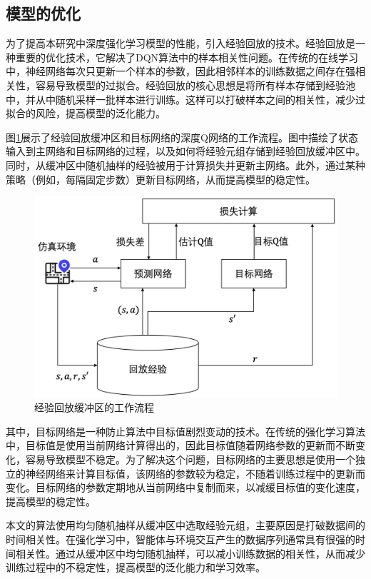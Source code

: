 \subsection{模型的优化}

为了提高本研究中深度强化学习模型的性能，引入经验回放的技术。经验回放是一种重要的优化技术，它解决了DQN算法中的样本相关性问题。在传统的在线学习中，神经网络每次只更新一个样本的参数，因此相邻样本的训练数据之间存在强相关性，容易导致模型的过拟合。经验回放的核心思想是将所有样本存储到经验池中，并从中随机采样一批样本进行训练。这样可以打破样本之间的相关性，减少过拟合的风险，提高模型的泛化能力。

图\ref{reply}展示了经验回放缓冲区和目标网络的深度Q网络的工作流程。图中描绘了状态输入到主网络和目标网络的过程，以及如何将经验元组存储到经验回放缓冲区中。同时，从缓冲区中随机抽样的经验被用于计算损失并更新主网络。此外，通过某种策略（例如，每隔固定步数）更新目标网络，从而提高模型的稳定性。

\begin{figure}[H]
  \centering
  \includegraphics[width=.75\linewidth]{figures/content/reply.png}
  \caption{经验回放缓冲区的工作流程}
  \label{reply}
\end{figure}


其中，目标网络是一种防止算法中目标值剧烈变动的技术。在传统的强化学习算法中，目标值是使用当前网络计算得出的，因此目标值随着网络参数的更新而不断变化，容易导致模型不稳定。为了解决这个问题，目标网络的主要思想是使用一个独立的神经网络来计算目标值，该网络的参数较为稳定，不随着训练过程中的更新而变化。目标网络的参数定期地从当前网络中复制而来，以减缓目标值的变化速度，提高模型的稳定性。

本文的算法使用均匀随机抽样从缓冲区中选取经验元组，主要原因是打破数据间的时间相关性。在强化学习中，智能体与环境交互产生的数据序列通常具有很强的时间相关性。通过从缓冲区中均匀随机抽样，可以减小训练数据的相关性，从而减少训练过程中的不稳定性，提高模型的泛化能力和学习效率。

